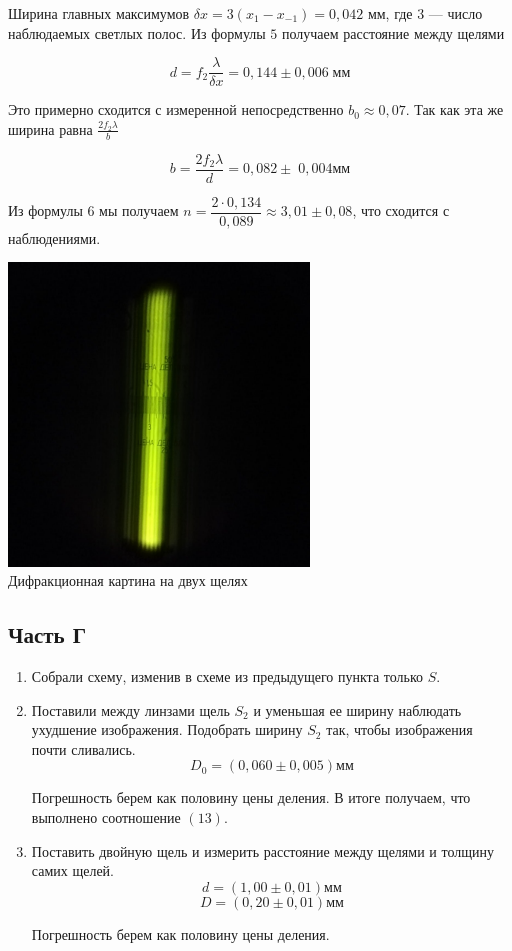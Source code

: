 \documentclass[a4paper, 12pt]{article}%
\begin{document}
 Ширина главных максимумов $  \delta x  = 3 (x_{1} - x_{-1} )= 0,042 $ мм, где 3 --- число наблюдаемых светлых полос. Из формулы $5$ получаем расстояние между щелями 
 
 \begin{equation}\label{}
 d = f_2 \dfrac{\lambda}{\delta x} = 0,144 \pm 0,006 \; мм
 \end{equation}
 
Это примерно сходится с измеренной непосредственно $ b_0 \approx 0,07 $. Так как эта же ширина равна $ \frac{2f_2 \lambda}{b}$
 
 \begin{equation}\label{}
 b = \dfrac{2 f_2 \lambda}{d} = 0,082 \pm \;0,004 мм
 \end{equation}
 
 Из формулы 6 мы получаем $ n = \dfrac{2\cdot 0,134}{0,089} \approx 3,01 \pm 0,08 $, что сходится с наблюдениями. 
 
  \begin{center}
    \includegraphics[width = 0.6\textwidth]{pics/8.png}\\
    
    Дифракционная картина на двух щелях
  \end{center}
 
 \newpage
\subsection*{Часть Г}
\begin{enumerate}
\item Собрали схему, изменив в схеме из предыдущего пункта только $S$.
\item Поставили между линзами щель $S_2$ и уменьшая ее ширину наблюдать ухудшение изображения. Подобрать ширину $S_2$ так, чтобы изображения почти сливались.
\[D_0 = (0,060 \pm 0,005)\text{мм}\]


Погрешность берем как половину цены деления.
В итоге получаем, что выполнено соотношение $(13)$.
\item Поставить двойную щель и измерить расстояние между щелями и толщину самих щелей. 
\[d = (1,00 \pm 0,01) \text{мм}\]
\[D = (0,20 \pm 0,01) \text{мм}\]

Погрешность берем как половину цены деления.
\end{enumerate}
\end{document}
